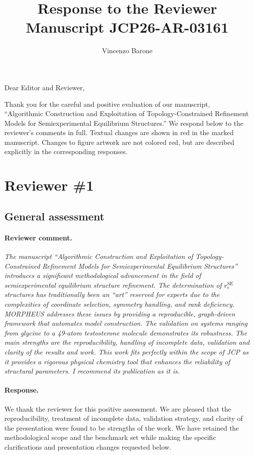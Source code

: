 \documentclass[11pt]{article}
\title{Response to the Reviewer\\[0.4em]
\large Manuscript JCP26-AR-03161}
\author{Vincenzo Barone}
\date{}
\begin{document}
\maketitle

Dear Editor and Reviewer,

Thank you for the careful and positive evaluation of our manuscript,
``Algorithmic Construction and Exploitation of Topology-Constrained Refinement
Models for Semiexperimental Equilibrium Structures.'' We respond below to the
reviewer's comments in full. Textual changes are shown in red in the marked
manuscript. Changes to figure artwork are not colored red, but are described
explicitly in the corresponding responses.

\section*{Reviewer \#1}

\subsection*{General assessment}

\paragraph{Reviewer comment.}
\emph{The manuscript ``Algorithmic Construction and Exploitation of
Topology-Constrained Refinement Models for Semiexperimental Equilibrium
Structures'' introduces a significant methodological advancement in the field
of semiexperimental equilibrium structure refinement. The determination of
$r_e^{\mathrm{SE}}$ structures has traditionally been an ``art'' reserved for
experts due to the complexities of coordinate selection, symmetry handling,
and rank deficiency. MORPHEUS addresses these issues by providing a
reproducible, graph-driven framework that automates model construction. The
validation on systems ranging from glycine to a 49-atom testosterone molecule
demonstrates its robustness. The main strengths are the reproducibility,
handling of incomplete data, validation and clarity of the results and work.
This work fits perfectly within the scope of JCP as it provides a rigorous
physical chemistry tool that enhances the reliability of structural
parameters. I recommend its publication as it is.}

\paragraph{Response.}
We thank the reviewer for this positive assessment. We are pleased that the
reproducibility, treatment of incomplete data, validation strategy, and clarity
of the presentation were found to be strengths of the work. We have retained
the methodological scope and the benchmark set while making the specific
clarifications and presentation changes requested below.
\end{document}
